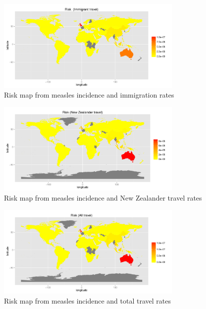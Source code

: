 \documentclass{article}
\begin{document}
\begin{figure}[h!]
 \centering
 \includegraphics[width=0.8\textwidth]{np4.pdf}
\caption{Risk map from measles incidence and immigration rates}
\label{fig:risk12}
\end{figure}

\begin{figure}
     \centering
     \includegraphics[width=0.8\textwidth]{nznp4.pdf}
     \caption{Risk map from measles incidence and New Zealander travel rates}
     \label{fig:nzrisk12}
\end{figure}

\begin{figure}
     \centering
     \includegraphics[width=0.8\textwidth]{totnp4.pdf}
     \caption{Risk map from measles incidence and total travel rates}
     \label{fig:totrisk12}
\end{figure}
\end{document}
